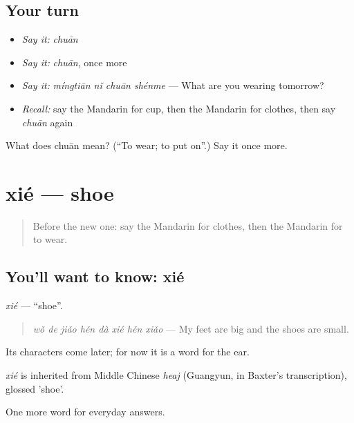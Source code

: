 \subsection*{Your turn}
\begin{itemize}
\raggedright
  \item \emph{Say it:} \emph{chuān}
  \item \emph{Say it:} \emph{chuān}, once more
  \item \emph{Say it:} \emph{míngtiān nǐ chuān shénme} — What are you wearing tomorrow?
  \item \emph{Recall:} say the Mandarin for cup, then the Mandarin for clothes, then say \emph{chuān} again
\end{itemize}

\begin{tcolorbox}[breakable,colback=teal!4,colframe=teal!35!black,title={Before you move on}]
What does chuān mean? (\textquotedblleft{}To wear; to put on\textquotedblright{}.) Say it once more.
\end{tcolorbox}
\section[xié]{xié — shoe}

\label{lesson:ZH-C59-xie}



\begin{quote}
Before the new one: say the Mandarin for clothes, then the Mandarin for to wear.
\end{quote}

\subsection*{You'll want to know: xié}
\emph{xié} — \textquotedblleft{}shoe\textquotedblright{}.

\begin{quote}
\emph{wǒ de jiǎo hěn dà xié hěn xiǎo} — My feet are big and the shoes are small.
\end{quote}

Its characters come later; for now it is a word for the ear.

\begin{cousinweb}
\emph{xié} is inherited from Middle Chinese \emph{heaj} (Guangyun, in Baxter's transcription), glossed 'shoe'.
\end{cousinweb}

\begin{grammarlens}[title={What you've built}]
One more word for everyday answers.
\end{grammarlens}

